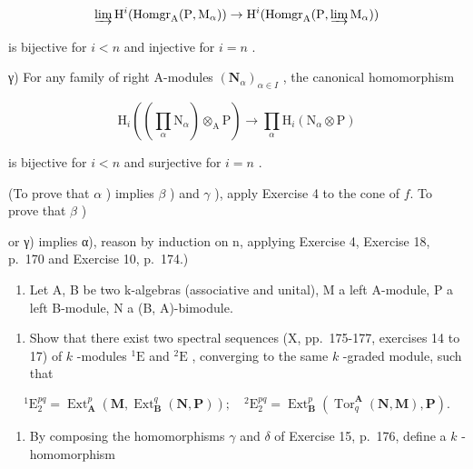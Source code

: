 \[
\varinjlim \mathrm{H} ^ {i} (\operatorname{Homgr} _ {\mathrm{A}} (\mathrm{P}, \mathrm{M} _ {\alpha})) \rightarrow \mathrm{H} ^ {i} (\operatorname{Homgr} _ {\mathrm{A}} (\mathrm{P}, \varinjlim \mathrm{M} _ {\alpha}))
\]

is bijective for \(i < n\) and injective for \(i = n\) .

γ) For any family of right A-modules \((\mathbf{N}_{\alpha})_{\alpha\in I}\) , the canonical homomorphism

\[
\mathrm{H} _ {i} ((\prod_ {\alpha} \mathrm{N} _ {\alpha}) \otimes_ {\mathrm{A}} \mathrm{P}) \rightarrow \prod_ {\alpha} \mathrm{H} _ {i} (\mathrm{N} _ {\alpha} \otimes \mathrm{P})
\]

is bijective for \(i < n\) and surjective for \(i = n\) .

(To prove that \(\alpha\) ) implies \(\beta\) ) and \(\gamma\) ), apply Exercise 4 to the cone of \(f\). To prove that \(\beta\) )

or γ) implies α), reason by induction on n, applying Exercise 4, Exercise 18, p.~170 and Exercise 10, p.~174.)

\begin{enumerate}
\def\labelenumi{\arabic{enumi})}
\setcounter{enumi}{5}
\tightlist
\item
  Let A, B be two k-algebras (associative and unital), M a left A-module, P a left B-module, N a (B, A)-bimodule.
\end{enumerate}

\begin{enumerate}
\def\labelenumi{\alph{enumi})}
\tightlist
\item
  Show that there exist two spectral sequences (X, pp.~175-177, exercises 14 to 17) of \(k\) -modules \({}^{1}\mathrm{E}\) and \({}^{2}\mathrm{E}\) , converging to the same \(k\) -graded module, such that
\end{enumerate}

\[
{ } ^ { 1 } \mathrm{E} _ { 2 } ^ { p q } = \operatorname{Ext} _ { \mathbf { A } } ^ { p } ( \mathbf { M } , \operatorname{Ext} _ { \mathbf { B } } ^ { q } ( \mathbf { N } , \mathbf { P } ) ) ; \quad { } ^ { 2 } \mathrm{E} _ { 2 } ^ { p q } = \operatorname{Ext} _ { \mathbf { B } } ^ { p } ( \operatorname{Tor} _ { q } ^ { \mathbf { A } } ( \mathbf { N } , \mathbf { M } ) , \mathbf { P } ) .
\]

\begin{enumerate}
\def\labelenumi{\alph{enumi})}
\setcounter{enumi}{1}
\tightlist
\item
  By composing the homomorphisms \(\gamma\) and \(\delta\) of Exercise 15, p.~176, define a \(k\) -homomorphism
\end{enumerate}

